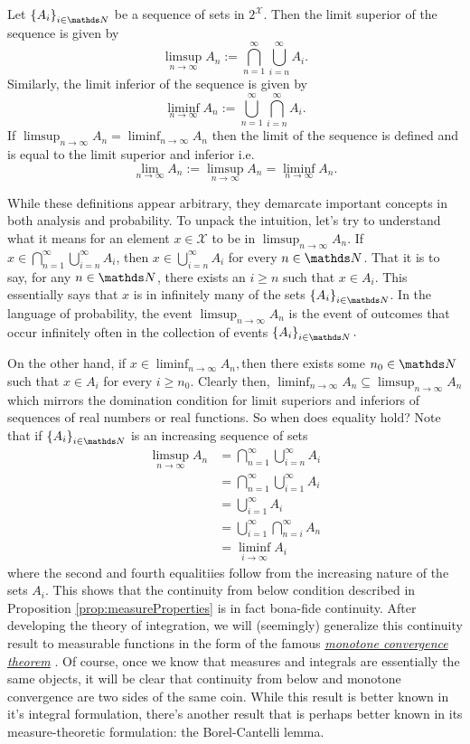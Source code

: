 \begin{defn}
\label{def:limSupInfSets} Let $\left\{ A_{i}\right\} _{i\in\N}$
be a sequence of sets in $2^{\mathcal{X}}$. Then the limit superior
of the sequence is given by
\[
\limsup_{n\to\infty}A_{n}:=\bigcap_{n=1}^{\infty}\bigcup_{i=n}^{\infty}A_{i}.
\]
Similarly, the limit inferior of the sequence is given by
\[
\liminf_{n\to\infty}A_{n}:=\bigcup_{n=1}^{\infty}\bigcap_{i=n}^{\infty}A_{i}.
\]
If $\limsup_{n\to\infty}A_{n}=\liminf_{n\to\infty}A_{n}$ then the
limit of the sequence is defined and is equal to the limit superior
and inferior i.e.
\[
\lim_{n\to\infty}A_{n}:=\limsup_{n\to\infty}A_{n}=\liminf_{n\to\infty}A_{n}.
\]

While these definitions appear arbitrary, they demarcate important
concepts in both analysis and probability. To unpack the intuition,
let's try to understand what it means for an element $x\in\mathcal{X}$
to be in $\limsup_{n\to\infty}A_{n}$. If $x\in\bigcap_{n=1}^{\infty}\bigcup_{i=n}^{\infty}A_{i}$,
then $x\in\bigcup_{i=n}^{\infty}A_{i}$ for every $n\in\N$. That
it is to say, for any $n\in\N$, there exists an $i\geq n$ such that
$x\in A_{i}$. This essentially says that $x$ is in infinitely many
of the sets $\left\{ A_{i}\right\} _{i\in\N}$. In the language of
probability, the event $\limsup_{n\to\infty}A_{n}$ is the event of
outcomes that occur infinitely often in the collection of events $\left\{ A_{i}\right\} _{i\in\N}.$

On the other hand, if $x\in\liminf_{n\to\infty}A_{n},$then there
exists some $n_{0}\in\N$ such that $x\in A_{i}$ for every $i\geq n_{0}$.
Clearly then, $\liminf_{n\to\infty}A_{n}\subseteq\limsup_{n\to\infty}A_{n}$
which mirrors the domination condition for limit superiors and inferiors
of sequences of real numbers or real functions. So when does equality
hold? Note that if $\left\{ A_{i}\right\} _{i\in\N}$ is an increasing
sequence of sets
\begin{align*}
\limsup_{n\to\infty}A_{n} & =\bigcap_{n=1}^{\infty}\bigcup_{i=n}^{\infty}A_{i}\\
 & =\bigcap_{n=1}^{\infty}\bigcup_{i=1}^{\infty}A_{i}\\
 & =\bigcup_{i=1}^{\infty}A_{i}\\
 & =\bigcup_{i=1}^{\infty}\bigcap_{n=i}^{\infty}A_{n}\\
 & =\liminf_{i\to\infty}A_{i}
\end{align*}
where the second and fourth equalitiies follow from the increasing
nature of the sets $A_{i}$. This shows that the continuity from below
condition described in Proposition \ref{prop:measureProperties} is
in fact bona-fide continuity. After developing the theory of integration,
we will (seemingly) generalize this continuity result to measurable
functions in the form of the famous \hyperref[thm:monotoneConvergenceLebInt]{\emph{monotone convergence theorem}}
. Of course, once we know that measures and integrals are essentially
the same objects, it will be clear that continuity from below and
monotone convergence are two sides of the same coin. While this result
is better known in it's integral formulation, there's another result
that is perhaps better known in its measure-theoretic formulation:
the Borel-Cantelli lemma.
\end{defn}

